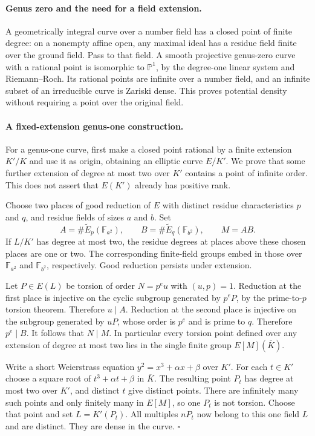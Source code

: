 \documentclass[11pt]{article}
\begin{document}
\paragraph{Genus zero and the need for a field extension.}
A geometrically integral curve over a number field has a closed point of finite degree: on a nonempty affine open, any maximal ideal has a residue field finite over the ground field. Pass to that field. A smooth projective genus-zero curve with a rational point is isomorphic to $\mathbb P^1$, by the degree-one linear system and Riemann--Roch. Its rational points are infinite over a number field, and an infinite subset of an irreducible curve is Zariski dense. This proves potential density without requiring a point over the original field.

\paragraph{A fixed-extension genus-one construction.}
For a genus-one curve, first make a closed point rational by a finite extension $K'/K$ and use it as origin, obtaining an elliptic curve $E/K'$. We prove that some further extension of degree at most two over $K'$ contains a point of infinite order. This does not assert that $E(K')$ already has positive rank.

Choose two places of good reduction of $E$ with distinct residue characteristics $p$ and $q$, and residue fields of sizes $a$ and $b$. Set
\[
 A=\#\widetilde E_p(\mathbb F_{a^2}),\qquad
 B=\#\widetilde E_q(\mathbb F_{b^2}),\qquad M=AB.
\]
If $L/K'$ has degree at most two, the residue degrees at places above these chosen places are one or two. The corresponding finite-field groups embed in those over $\mathbb F_{a^2}$ and $\mathbb F_{b^2}$, respectively. Good reduction persists under extension.

Let $P\in E(L)$ be torsion of order $N=p^e u$ with $(u,p)=1$. Reduction at the first place is injective on the cyclic subgroup generated by $p^eP$, by the prime-to-$p$ torsion theorem. Therefore $u\mid A$. Reduction at the second place is injective on the subgroup generated by $uP$, whose order is $p^e$ and is prime to $q$. Therefore $p^e\mid B$. It follows that $N\mid M$. In particular every torsion point defined over any extension of degree at most two lies in the single finite group $E[M](\overline K)$.

Write a short Weierstrass equation $y^2=x^3+\alpha x+\beta$ over $K'$. For each $t\in K'$ choose a square root of $t^3+\alpha t+\beta$ in $\overline K$. The resulting point $P_t$ has degree at most two over $K'$, and distinct $t$ give distinct points. There are infinitely many such points and only finitely many in $E[M]$, so one $P_t$ is not torsion. Choose that point and set $L=K'(P_t)$. All multiples $nP_t$ now belong to this one field $L$ and are distinct. They are dense in the curve. \hfill$\square$
\end{document}
